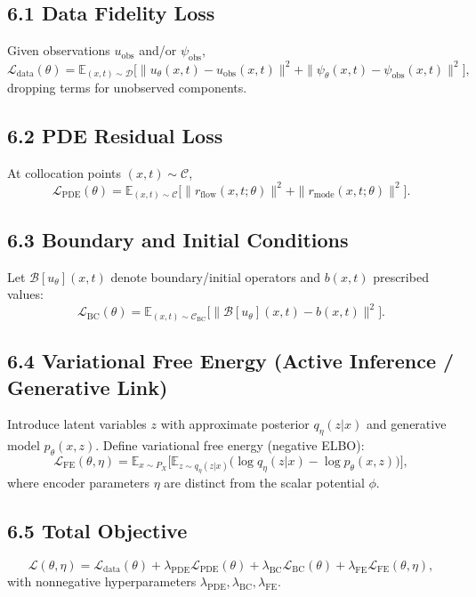 \documentclass[11pt]{article}
\begin{document}
\subsection*{6.1 Data Fidelity Loss}
Given observations $u_{\text{obs}}$ and/or $\psi_{\text{obs}}$,
\begin{equation}
\mathcal{L}_{\text{data}}(\theta)
=
\mathbb{E}_{(x,t)\sim \mathcal{D}}
\Big[
\|u_\theta(x,t)-u_{\text{obs}}(x,t)\|^2
+
\|\psi_\theta(x,t)-\psi_{\text{obs}}(x,t)\|^2
\Big],
\end{equation}
dropping terms for unobserved components.

\subsection*{6.2 PDE Residual Loss}
At collocation points $(x,t)\sim \mathcal{C}$,
\begin{equation}
\mathcal{L}_{\text{PDE}}(\theta)
=
\mathbb{E}_{(x,t)\sim \mathcal{C}}
\Big[
\|r_{\text{flow}}(x,t;\theta)\|^2
+
\|r_{\text{mode}}(x,t;\theta)\|^2
\Big].
\end{equation}

\subsection*{6.3 Boundary and Initial Conditions}
Let $\mathcal{B}[u_\theta](x,t)$ denote boundary/initial operators and $b(x,t)$ prescribed values:
\begin{equation}
\mathcal{L}_{\text{BC}}(\theta)
=
\mathbb{E}_{(x,t)\sim \mathcal{C}_{\text{BC}}}
\Big[
\|\mathcal{B}[u_\theta](x,t)-b(x,t)\|^2
\Big].
\end{equation}

\subsection*{6.4 Variational Free Energy (Active Inference / Generative Link)}
Introduce latent variables $z$ with approximate posterior $q_\eta(z|x)$ and generative model $p_\theta(x,z)$.
Define variational free energy (negative ELBO):
\begin{equation}
\mathcal{L}_{\text{FE}}(\theta,\eta)
=
\mathbb{E}_{x\sim P_X}
\Big[
\mathbb{E}_{z\sim q_\eta(z|x)}
\big(\log q_\eta(z|x)-\log p_\theta(x,z)\big)
\Big],
\end{equation}
where encoder parameters $\eta$ are distinct from the scalar potential $\phi$.

\subsection*{6.5 Total Objective}
\begin{equation}
\mathcal{L}(\theta,\eta)
=
\mathcal{L}_{\text{data}}(\theta)
+\lambda_{\text{PDE}}\mathcal{L}_{\text{PDE}}(\theta)
+\lambda_{\text{BC}}\mathcal{L}_{\text{BC}}(\theta)
+\lambda_{\text{FE}}\mathcal{L}_{\text{FE}}(\theta,\eta),
\end{equation}
with nonnegative hyperparameters $\lambda_{\text{PDE}},\lambda_{\text{BC}},\lambda_{\text{FE}}$.
\end{document}
